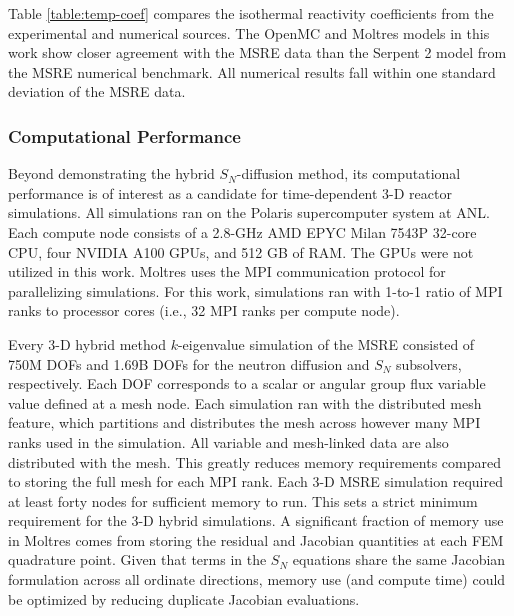 Table \ref{table:temp-coef} compares the isothermal reactivity coefficients from the experimental
and numerical sources. The OpenMC and Moltres models in this work show closer agreement with the
\gls{MSRE} data than the Serpent 2 model from the \gls{MSRE} numerical benchmark. All numerical
results fall within one standard deviation of the \gls{MSRE} data.

\subsubsection{Computational Performance}

Beyond demonstrating the hybrid $S_N$-diffusion method, its computational performance is of
interest as a candidate for time-dependent 3-D reactor simulations. All simulations ran on the
Polaris supercomputer system at \gls{ANL}. Each compute node consists of a 2.8-GHz AMD EPYC Milan
7543P 32-core CPU, four NVIDIA A100 GPUs, and 512 GB of RAM. The GPUs were not utilized in this
work. Moltres uses the \gls{MPI} communication protocol for parallelizing simulations. For this
work, simulations ran with 1-to-1 ratio of \gls{MPI} ranks to processor cores (i.e., 32 \gls{MPI}
ranks per compute node).

Every 3-D hybrid method $k$-eigenvalue
simulation of the \gls{MSRE} consisted of 750M \glspl{DOF} and 1.69B \glspl{DOF} for
the neutron diffusion and $S_N$ subsolvers, respectively. Each \gls{DOF} corresponds to a scalar
or angular group flux variable value defined at a mesh node. Each simulation ran with the distributed
mesh feature, which partitions and distributes the mesh across however many \gls{MPI} ranks used
in the simulation. All variable and mesh-linked data are also distributed with the mesh. This
greatly reduces memory requirements compared to storing the full mesh for each \gls{MPI} rank.
Each 3-D \gls{MSRE} simulation required at least forty nodes for sufficient memory to run. This
sets a strict minimum requirement for the 3-D hybrid simulations. A significant fraction of
memory use in Moltres comes from storing the residual and Jacobian quantities at each \gls{FEM}
quadrature point. Given that terms in the $S_N$ equations share the same Jacobian formulation
across all ordinate directions, memory use (and compute time) could be optimized by reducing
duplicate Jacobian evaluations.

